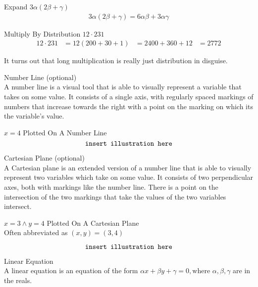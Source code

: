 \documentclass{book}
\begin{document}
  {\example Expand $3 \alpha(2 \beta + \gamma)$ 
    \begin{align*}
      3 \alpha (2 \beta + \gamma) = 6 \alpha \beta + 3 \alpha \gamma
    \end{align*}
  }

  {\example Multiply By Distribution $12 \cdot 231$
    \begin{align*}
      12 \cdot 231 & = 12 (200 + 30 + 1)
      & = 2400 + 360 + 12
      & = 2772
    \end{align*}

    It turns out that long multiplication is really just distribution in disguise.\\
  }

  {\remark Number Line (optional) \\
    A number line is a visual tool that is able to visually represent a variable that takes on some value. It consists of a single axis, with regularly spaced markings of numbers that increase towards the right with a point on the marking on which its the variable's value.\\
  }

  {\example $x = 4$ Plotted On A Number Line\\
    $$\text{\texttt{insert illustration here}}$$
  }

  {\remark Cartesian Plane (optional) \\
    A Cartesian plane is an extended version of a number line that is able to visually represent two variables which take on some value. It consists of two perpendicular axes, both with markings like the number line. There is a point on the intersection of the two markings that take the values of the two variables intersect.\\
  }

  {\example $x = 3 \land y = 4$ Plotted On A Cartesian Plane \\
    Often abbreviated as $(x, y) = (3, 4)$

    $$\text{\texttt{insert illustration here}}$$
  }

  {\remark Linear Equation \\
    A linear equation is an equation of the form $\alpha x + \beta y + \gamma = 0, \text{where } \alpha, \beta, \gamma$ are in the reals.\\
  }
\end{document}
